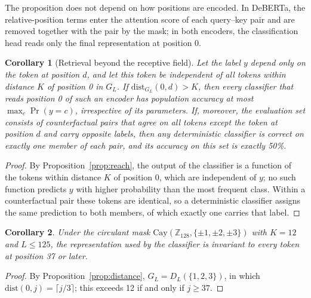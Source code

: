 \documentclass[10pt]{article}
\newtheorem{corollary}{Corollary}
\newcommand{\Z}{\mathbb{Z}}
\newcommand{\Cay}{\mathrm{Cay}}
\begin{document}
The proposition does not depend on how positions are encoded. In DeBERTa, the relative-position terms enter the attention score of each query--key pair and are removed together with the pair by the mask; in both encoders, the classification head reads only the final representation at position 0.

\begin{corollary}[Retrieval beyond the receptive field]
\label{cor:impossible}
Let the label $y$ depend only on the token at position $d$, and let this token be independent of all tokens within distance $K$ of position 0 in $G_L$. If $\mathrm{dist}_{G_L}(0,d)>K$, then every classifier that reads position 0 of such an encoder has population accuracy at most $\max_c\Pr(y=c)$, irrespective of its parameters. If, moreover, the evaluation set consists of counterfactual pairs that agree on all tokens except the token at position $d$ and carry opposite labels, then any deterministic classifier is correct on exactly one member of each pair, and its accuracy on this set is exactly 50\%.
\end{corollary}
\begin{proof}
By Proposition~\ref{prop:reach}, the output of the classifier is a function of the tokens within distance $K$ of position 0, which are independent of $y$; no such function predicts $y$ with higher probability than the most frequent class. Within a counterfactual pair these tokens are identical, so a deterministic classifier assigns the same prediction to both members, of which exactly one carries that label.
\end{proof}

\begin{corollary}
\label{cor:circ}
Under the circulant mask $\Cay(\Z_{128},\{\pm1,\pm2,\pm3\})$ with $K=12$ and $L\le125$, the representation used by the classifier is invariant to every token at position 37 or later.
\end{corollary}
\begin{proof}
By Proposition~\ref{prop:distance}, $G_L=D_L(\{1,2,3\})$, in which $\mathrm{dist}(0,j)=\lceil j/3\rceil$; this exceeds 12 if and only if $j\ge37$.
\end{proof}
\end{document}
